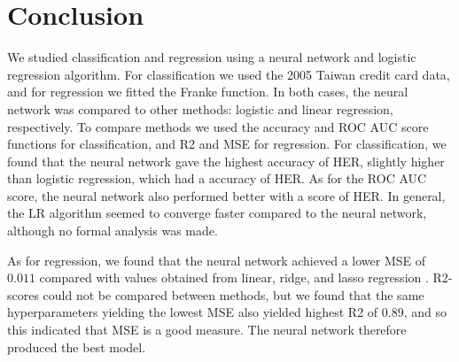 \section{Conclusion}
\label{sec:conclusion}

We studied classification and regression using a neural network and logistic regression
algorithm. For classification we used the 2005 Taiwan credit card data,
and for regression we fitted the Franke function. In both cases, the neural network
was compared to other methods: logistic and linear regression, respectively.
To compare methods we used the accuracy and ROC AUC score functions for classification,
and R2 and MSE for regression. For classification, we found that the neural network gave
the highest accuracy of HER, slightly higher than logistic regression, which had a
accuracy of HER. As for the ROC AUC score, the neural network also performed better
with a score of HER. In general, the LR algorithm seemed to converge faster compared to
the neural network, although no formal analysis was made.

As for regression, we found that the neural network achieved a lower MSE of $0.011$ compared
with values obtained from linear, ridge, and lasso regression \citep{prosjekt1}.
R2-scores could not be compared between methods, but we found that the same hyperparameters
yielding the lowest MSE also yielded highest R2 of $0.89$, and so this indicated that MSE is a
good measure. The neural network therefore produced the best model.
